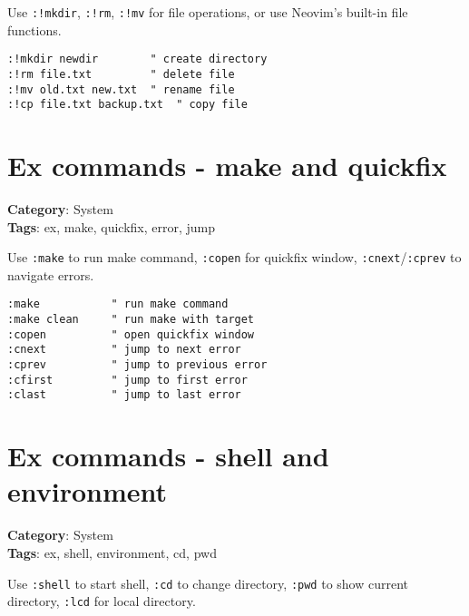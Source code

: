 {{{{{{{{{{{{{Use {\footnotesize \Verb§:!mkdir§}, {\footnotesize \Verb§:!rm§}, {\footnotesize \Verb§:!mv§} for file operations, or use Neovim's built-in file functions.

\begin{Exa*}{}
\begin{Verbatim}[fontsize=\footnotesize, breaklines, breakanywhere]
:!mkdir newdir        " create directory
:!rm file.txt         " delete file
:!mv old.txt new.txt  " rename file
:!cp file.txt backup.txt  " copy file
\end{Verbatim}
\end{Exa*}

\section{Ex commands - make and quickfix}

\textbf{Category}: System\\ \textbf{Tags}: ex, make, quickfix, error, jump
\vspace{0.5cm}

Use {\footnotesize \Verb§:make§} to run make command, {\footnotesize \Verb§:copen§} for quickfix window, {\footnotesize \Verb§:cnext§}/{\footnotesize \Verb§:cprev§} to navigate errors.

\begin{Exa*}{}
\begin{Verbatim}[fontsize=\footnotesize, breaklines, breakanywhere]
:make           " run make command
:make clean     " run make with target
:copen          " open quickfix window
:cnext          " jump to next error
:cprev          " jump to previous error
:cfirst         " jump to first error
:clast          " jump to last error
\end{Verbatim}
\end{Exa*}

\section{Ex commands - shell and environment}

\textbf{Category}: System\\ \textbf{Tags}: ex, shell, environment, cd, pwd
\vspace{0.5cm}

Use {\footnotesize \Verb§:shell§} to start shell, {\footnotesize \Verb§:cd§} to change directory, {\footnotesize \Verb§:pwd§} to show current directory, {\footnotesize \Verb§:lcd§} for local directory.

}}}}}}}}}}}}}
